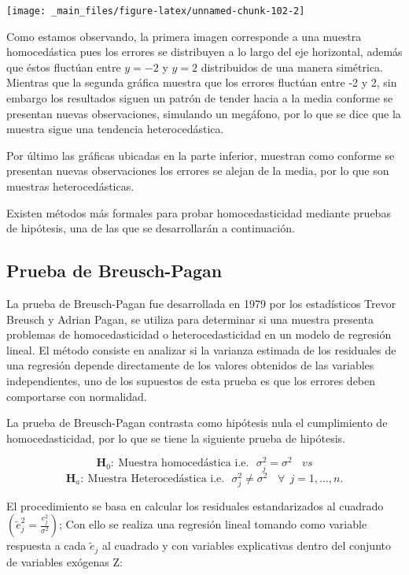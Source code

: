 \documentclass[
  a4paper,
  oneside,
  openany]{book}
\begin{document}
\begin{center}\texttt{[image: \_main\_files/figure-latex/unnamed-chunk-102-2]} \end{center}

Como estamos observando, la primera imagen corresponde a una muestra homocedástica pues los errores se distribuyen a lo largo del eje horizontal, además que éstos fluctúan entre \(y=-2\) y \(y=2\) distribuidos de una manera simétrica. Mientras que la segunda gráfica muestra que los errores fluctúan entre -2 y 2, sin embargo los resultados siguen un patrón de tender hacia a la media conforme se presentan nuevas observaciones, simulando un megáfono, por lo que se dice que la muestra sigue una tendencia heterocedástica.

Por último las gráficas ubicadas en la parte inferior, muestran como conforme se presentan nuevas observaciones los errores se alejan de la media, por lo que son muestras heterocedásticas.

Existen métodos más formales para probar homocedasticidad mediante pruebas de hipótesis, una de las que se desarrollarán a continuación.

\hypertarget{prueba-de-breusch-pagan}{%
\subsection{Prueba de Breusch-Pagan}\label{prueba-de-breusch-pagan}}

La prueba de Breusch-Pagan fue desarrollada en 1979 por los estadísticos Trevor Breusch y Adrian Pagan, se utiliza para determinar si una muestra presenta problemas de homocedasticidad o heterocedasticidad en un modelo de regresión lineal. El método consiste en analizar si la varianza estimada de los residuales de una regresión depende directamente de los valores obtenidos de las variables independientes, uno de los supuestos de esta prueba es que los errores deben comportarse con normalidad.

La prueba de Breusch-Pagan contrasta como hipótesis nula el cumplimiento de homocedasticidad, por lo que se tiene la siguiente prueba de hipótesis.

\[\textbf{H}_0: \ \mbox{Muestra homocedástica  i.e.} \ \ \ \sigma^2_{j}=\sigma^2 \ \ \ \ vs \]
\[\textbf{H}_a:  \ \mbox{Muestra Heterocedástica  i.e.} \ \ \ \sigma^2_{j} \neq \sigma^2 \ \ \ \ \forall  \ \ j = 1,\ldots,n.\]

El procedimiento se basa en calcular los residuales estandarizados al cuadrado \(\left( \tilde{e}^2_{j}=\frac{e^2_{j}}{\sigma^2}\right)\); Con ello se realiza una regresión lineal tomando como variable respuesta a cada \(\tilde{e}_{j}\) al cuadrado y con variables explicativas dentro del conjunto de variables exógenas Z:
\end{document}
